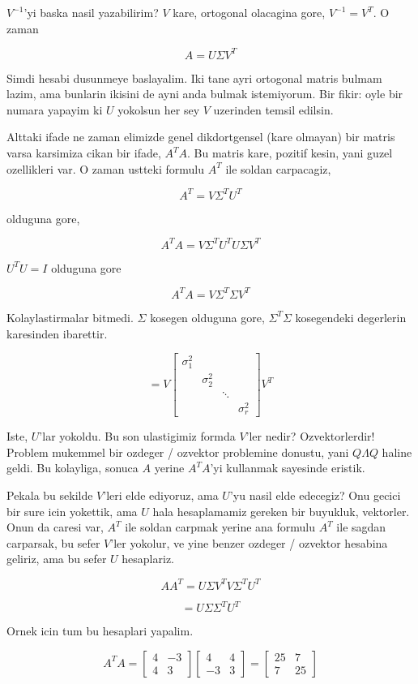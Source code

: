 \documentclass[12pt,fleqn]{article}\usepackage{../common}
\begin{document}
$V^{-1}$'yi baska nasil yazabilirim? $V$ kare, ortogonal olacagina gore,
$V^{-1} = V^{T}$. O zaman 

\[ A = U \Sigma V^{T} \]

Simdi hesabi dusunmeye baslayalim. Iki tane ayri ortogonal matris bulmam
lazim, ama bunlarin ikisini de ayni anda bulmak istemiyorum. Bir fikir:
oyle bir numara yapayim ki $U$ yokolsun her sey $V$ uzerinden temsil
edilsin. 

Alttaki ifade ne zaman elimizde genel dikdortgensel (kare olmayan) bir
matris varsa karsimiza cikan bir ifade, $A^TA$. Bu matris kare, pozitif
kesin, yani guzel ozellikleri var. O zaman ustteki formulu $A^T$ ile soldan
carpacagiz,

\[ A^T = V \Sigma^T U^{T}  \]

olduguna gore,

\[ A^TA = V \Sigma^T U^{T}  U \Sigma V^{T}  \]

$U^TU = I$ olduguna gore

\[ A^TA = V \Sigma^T \Sigma V^{T}  \]

Kolaylastirmalar bitmedi. $\Sigma$ kosegen olduguna gore, $\Sigma^T\Sigma$
kosegendeki degerlerin karesinden ibarettir. 

\[ = V 
\left[\begin{array}{rrrr}
\sigma_1^2 &&& \\
 & \sigma_2^2 &  & \\
&& \ddots & \\
&&& \sigma_r^2 
\end{array}\right] 
V^T
  \]

Iste, $U$'lar yokoldu. Bu son ulastigimiz formda $V$'ler nedir?
Ozvektorlerdir! Problem mukemmel bir ozdeger / ozvektor problemine
donustu, yani $Q\Lambda Q$ haline geldi. Bu kolayliga, sonuca $A$ yerine $A^TA$'yi
kullanmak sayesinde eristik.

Pekala bu sekilde $V$'leri elde ediyoruz, ama $U$'yu nasil elde edecegiz?
Onu gecici bir sure icin yokettik, ama $U$ hala hesaplamamiz gereken bir
buyukluk, vektorler. Onun da caresi var, $A^T$ ile soldan carpmak yerine ana
formulu $A^T$ ile sagdan carparsak, bu sefer $V$'ler yokolur, ve yine
benzer ozdeger / ozvektor hesabina geliriz, ama bu sefer $U$ hesaplariz.

\[ AA^T = U\Sigma V^TV\Sigma^TU^T \]

\[  = U\Sigma \Sigma^TU^T \]

Ornek icin tum bu hesaplari yapalim. 

\[ A^TA = 
\left[\begin{array}{rr}
4 & -3 \\ 4 & 3
\end{array}\right]
\left[\begin{array}{rr}
4 & 4 \\ -3 & 3
\end{array}\right] = 
\left[\begin{array}{cc}
25 & 7 \\ 7 & 25
\end{array}\right]
 \]
\end{document}
